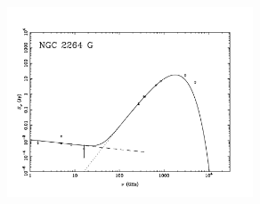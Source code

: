 \documentclass[9pt]{extarticle}   	%
\begin{document}
\begin{figure}[htbp]
\begin{center}
\includegraphics[width=0.65\textwidth]{plots/NGC2264.pdf}
\label{default}
\end{center}
\end{figure}

\clearpage
\end{document}
